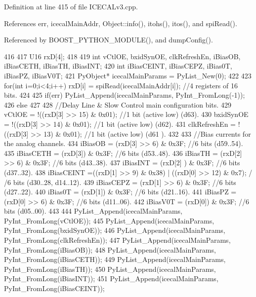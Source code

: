 Definition at line 415 of file ICECALv3.cpp.

References err, icecalMainAddr, Object::info(), itohs(), itos(), and spiRead().

Referenced by BOOST\_\-PYTHON\_\-MODULE(), and dumpConfig().


\begin{DoxyCode}
416 {                            
417     U16 rxD[4];
418 
419     int vCtlOE, bxidSynOE, clkRefreshEn, iBiasOB, iBiasCETH, iBiasTH, iBiasINT;
420     int iBiasCEINT, iBiasCEPZ, iBias0T, iBiasPZ, iBiasV0T;
421     PyObject* icecalMainParams = PyList_New(0);
422 
423     for(int i=0;i<4;i++) rxD[i] = spiRead(icecalMainAddr[i]);       //4 registers
       of 16 bits.
424 
425     if(err) PyList_Append(icecalMainParams, PyInt_FromLong(-1));
426     else
427     {
428         //Delay Line & Slow Control main configuration bits.
429         vCtlOE              = !((rxD[3] >> 15) & 0x01);     //1 bit (active low) 
      (d63).
430         bxidSynOE           = !((rxD[3] >> 14) & 0x01);     //1 bit (active low) 
      (d62).
431         clkRefreshEn    = !((rxD[3] >> 13) & 0x01);     //1 bit (active low) (d61
      ).
432 
433         //Bias currents for the analog channels.
434         iBiasOB             = (rxD[3] >> 6) & 0x3F;     //6 bits (d59..54).
435         iBiasCETH           = (rxD[3])          & 0x3F;     //6 bits (d53..48).
436         iBiasTH             = (rxD[2] >> 6) & 0x3F;     //6 bits (d43..38).
437         iBiasINT            = (rxD[2] )         & 0x3F;     //6 bits (d37..32).
438         iBiasCEINT      =((rxD[1] >> 9) & 0x38) | ((rxD[0] >> 12) & 0x7);       /
      /6 bits (d30..28, d14..12).
439         iBiasCEPZ           = (rxD[1] >> 6) & 0x3F;     //6 bits (d27..22).
440         iBias0T             = (rxD[1])          & 0x3F;     //6 bits (d21..16).
441         iBiasPZ             = (rxD[0] >> 6) & 0x3F;     //6 bits (d11..06).
442         iBiasV0T            = (rxD[0])          & 0x3F;     //6 bits (d05..00).
443 
444         PyList_Append(icecalMainParams, PyInt_FromLong(vCtlOE));
445         PyList_Append(icecalMainParams, PyInt_FromLong(bxidSynOE));
446         PyList_Append(icecalMainParams, PyInt_FromLong(clkRefreshEn));
447         PyList_Append(icecalMainParams, PyInt_FromLong(iBiasOB));
448         PyList_Append(icecalMainParams, PyInt_FromLong(iBiasCETH));
449         PyList_Append(icecalMainParams, PyInt_FromLong(iBiasTH));
450         PyList_Append(icecalMainParams, PyInt_FromLong(iBiasINT));
451         PyList_Append(icecalMainParams, PyInt_FromLong(iBiasCEINT));
}}
\end{DoxyCode}
